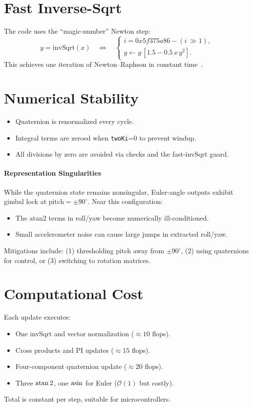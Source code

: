 \documentclass[12pt,letterpaper]{article}
\begin{document}
\section{Fast Inverse-Sqrt}
The code uses the “magic‐number” Newton step:
\[
y = \mathrm{invSqrt}(x)
\quad\Longleftrightarrow\quad
\begin{cases}
i = 0x5f375a86 - (i\,\gg1),\\
y \leftarrow y\,[1.5 - 0.5\,x\,y^2].
\end{cases}
\]
This achieves one iteration of Newton–Raphson in constant time~\cite{Quake2002}.

\section{Numerical Stability}
\begin{itemize}
  \item Quaternion is renormalized every cycle.
  \item Integral terms are zeroed when \texttt{twoKi}=0 to prevent windup.
  \item All divisions by zero are avoided via checks and the fast‐invSqrt guard.
\end{itemize}

\paragraph{Representation Singularities}  
While the quaternion state remains nonsingular, Euler-angle outputs exhibit gimbal lock at $\mathrm{pitch} = \pm90^\circ$. Near this configuration:  
\begin{itemize}  
  \item The $\mathrm{atan2}$ terms in roll/yaw become numerically ill-conditioned.  
  \item Small accelerometer noise can cause large jumps in extracted roll/yaw.  
\end{itemize}  
Mitigations include: (1) thresholding pitch away from $\pm90^\circ$, (2) using quaternions for control, or (3) switching to rotation matrices.

\section{Computational Cost}
Each update executes:
\begin{itemize}
  \item One invSqrt and vector normalization (\(\approx10\) flops).
  \item Cross products and PI updates (\(\approx15\) flops).
  \item Four-component quaternion update (\(\approx20\) flops).
  \item Three \(\atan2\), one \(\asin\) for Euler (\(\mathcal O(1)\) but costly).
\end{itemize}
Total is constant per step, suitable for microcontrollers.
\end{document}
